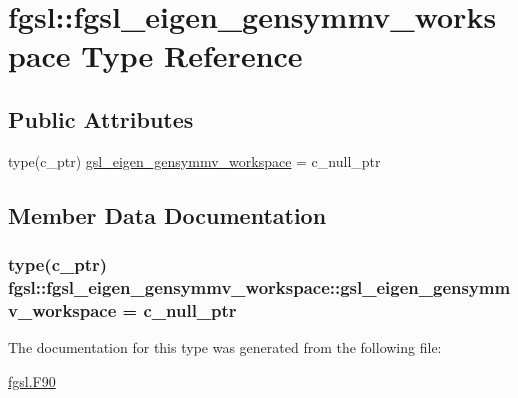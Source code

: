 \hypertarget{structfgsl_1_1fgsl__eigen__gensymmv__workspace}{\section{fgsl\-:\-:fgsl\-\_\-eigen\-\_\-gensymmv\-\_\-workspace Type Reference}
\label{structfgsl_1_1fgsl__eigen__gensymmv__workspace}
}
\subsection*{Public Attributes}
\begin{DoxyCompactItemize}
\item 
type(c\-\_\-ptr) \hyperlink{structfgsl_1_1fgsl__eigen__gensymmv__workspace_aafe47b9fd2e9dd43196912878c9c687b}{gsl\-\_\-eigen\-\_\-gensymmv\-\_\-workspace} = c\-\_\-null\-\_\-ptr
\end{DoxyCompactItemize}


\subsection{Member Data Documentation}
\hypertarget{structfgsl_1_1fgsl__eigen__gensymmv__workspace_aafe47b9fd2e9dd43196912878c9c687b}{
\subsubsection[{gsl\-\_\-eigen\-\_\-gensymmv\-\_\-workspace}]{\setlength{\rightskip}{0pt plus 5cm}type(c\-\_\-ptr) fgsl\-::fgsl\-\_\-eigen\-\_\-gensymmv\-\_\-workspace\-::gsl\-\_\-eigen\-\_\-gensymmv\-\_\-workspace = c\-\_\-null\-\_\-ptr}}\label{structfgsl_1_1fgsl__eigen__gensymmv__workspace_aafe47b9fd2e9dd43196912878c9c687b}


The documentation for this type was generated from the following file\-:\begin{DoxyCompactItemize}
\item 
\hyperlink{fgsl_8F90}{fgsl.\-F90}\end{DoxyCompactItemize}
